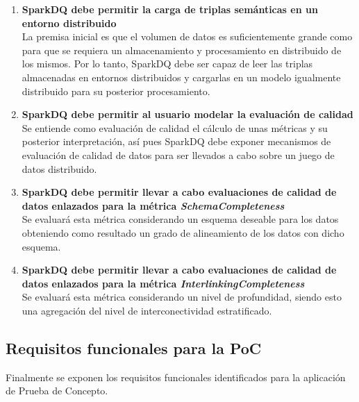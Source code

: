 \begin{enumerate}
\item \textbf{SparkDQ debe permitir la carga de triplas semánticas en un entorno
  distribuido} \\La premisa inicial es que el volumen de datos es
  suficientemente grande como para que se requiera un almacenamiento y
  procesamiento en distribuido de los mismos. Por lo tanto, SparkDQ debe ser
  capaz de leer las triplas almacenadas en entornos distribuidos y cargarlas en
  un modelo igualmente distribuido para su posterior procesamiento.
  
\item \textbf{SparkDQ debe permitir al usuario modelar la evaluación de
  calidad}\\Se entiende como evaluación de calidad el cálculo de unas métricas y
  su posterior interpretación, así pues SparkDQ debe exponer mecanismos de
  evaluación de calidad de datos para ser llevados a cabo sobre un juego de
  datos distribuido. 
\item \textbf{SparkDQ debe permitir llevar a cabo evaluaciones de calidad de
  datos enlazados para la métrica \textit{SchemaCompleteness}}\\Se evaluará esta
  métrica considerando un esquema deseable para los datos obteniendo como
  resultado un grado de alineamiento de los datos con dicho esquema. 

\item \textbf{SparkDQ debe permitir llevar a cabo evaluaciones de calidad de
  datos enlazados para la métrica \textit{InterlinkingCompleteness}}\\Se
  evaluará esta métrica considerando un nivel de profundidad, siendo esto una
  agregación del nivel de interconectividad estratificado. 
\end{enumerate}

\subsection{Requisitos funcionales para la PoC}

Finalmente se exponen los requisitos funcionales identificados para la
aplicación de Prueba de Concepto.

